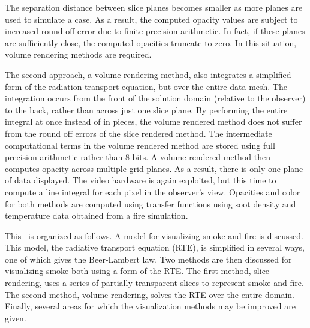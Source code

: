 The separation distance between slice planes becomes smaller as more planes are used to simulate a case.  As a result, the computed opacity values are subject to increased round off error due to finite precision arithmetic.  In fact, if these planes are sufficiently close, the computed opacities truncate to zero.   In this situation, volume rendering methods are required.

The second approach, a volume rendering method, also integrates a simplified form of the radiation transport equation, but over the entire data mesh.  The integration occurs from the front of the solution domain (relative to the observer) to the back, rather than across just one slice plane. By performing the entire integral at once instead of in pieces, the volume rendered method does not suffer from the round off errors of the slice rendered method.  The intermediate computational terms in the volume rendered method are stored using full precision arithmetic rather than 8 bits.  A volume rendered method then computes opacity across multiple grid planes.  As a result, there is only one plane of data displayed.  The video hardware is again exploited, but this time to compute a line integral for each pixel in the observer's view.  Opacities and color for both methods are computed using transfer functions using soot density and temperature data obtained from a fire simulation.

This \paper\ is organized as follows.  A model for visualizing smoke and fire is discussed.  This model, the radiative transport equation (RTE), is simplified in several ways, one of which gives the Beer-Lambert law.  Two methods are then discussed for visualizing smoke  both using a form of the RTE.  The first method, slice rendering,  uses a series of partially transparent slices to represent smoke and fire. The second method, volume rendering, solves the RTE over the entire domain. Finally, several areas for which the visualization methods may be improved are given.


